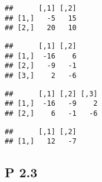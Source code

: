 \documentclass[
]{article}
\newenvironment{Shaded}{\begin{snugshade}}{\end{snugshade}}
\newcommand{\CommentTok}[1]{\textcolor[rgb]{0.56,0.35,0.01}{\textit{#1}}}
\newcommand{\KeywordTok}[1]{\textcolor[rgb]{0.13,0.29,0.53}{\textbf{#1}}}
\newcommand{\NormalTok}[1]{#1}
\newcommand{\OperatorTok}[1]{\textcolor[rgb]{0.81,0.36,0.00}{\textbf{#1}}}
\newcommand{\StringTok}[1]{\textcolor[rgb]{0.31,0.60,0.02}{#1}}
\begin{document}
\begin{verbatim}
##      [,1] [,2]
## [1,]   -5   15
## [2,]   20   10
\end{verbatim}

\begin{Shaded}
\end{Shaded}

\begin{verbatim}
##      [,1] [,2]
## [1,]  -16    6
## [2,]   -9   -1
## [3,]    2   -6
\end{verbatim}

\begin{Shaded}
\end{Shaded}

\begin{verbatim}
##      [,1] [,2] [,3]
## [1,]  -16   -9    2
## [2,]    6   -1   -6
\end{verbatim}

\begin{Shaded}
\end{Shaded}

\begin{verbatim}
##      [,1] [,2]
## [1,]   12   -7
\end{verbatim}

\begin{Shaded}
\end{Shaded}

\hypertarget{p-2.3}{%
\subsection{P 2.3}\label{p-2.3}}
\end{document}
